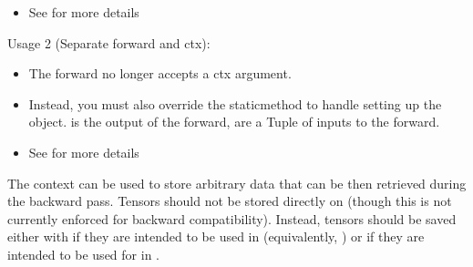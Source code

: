 \documentclass[letterpaper,10pt,english]{sphinxmanual}
\begin{document}
\begin{fulllineitems}
\begin{fulllineitems}
\begin{itemize}
\item {} 
\sphinxAtStartPar
See  for more details

\end{itemize}

\sphinxAtStartPar
Usage 2 (Separate forward and ctx):

\begin{sphinxVerbatim}[commandchars=\\\{\}]
      

    \PYG{p}{[} \PYG{p}{]}    
\end{sphinxVerbatim}
\begin{itemize}
\item {} 
\sphinxAtStartPar
The forward no longer accepts a ctx argument.

\item {} 
\sphinxAtStartPar
Instead, you must also override the 
staticmethod to handle setting up the  object.
 is the output of the forward,  are a Tuple of inputs
to the forward.

\item {} 
\sphinxAtStartPar
See  for more details

\end{itemize}

\sphinxAtStartPar
The context can be used to store arbitrary data that can be then
retrieved during the backward pass. Tensors should not be stored
directly on  (though this is not currently enforced for
backward compatibility). Instead, tensors should be saved either with
 if they are intended to be used in
 (equivalently, ) or 
if they are intended to be used for in .

\end{fulllineitems}


\end{fulllineitems}
\end{document}
